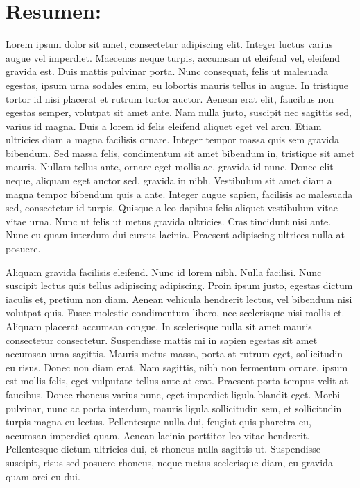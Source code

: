 %
%

\section*{Resumen:}

Lorem ipsum dolor sit amet, consectetur adipiscing elit. Integer luctus varius augue vel imperdiet. Maecenas neque turpis, accumsan ut eleifend vel, eleifend gravida est. Duis mattis pulvinar porta. Nunc consequat, felis ut malesuada egestas, ipsum urna sodales enim, eu lobortis mauris tellus in augue. In tristique tortor id nisi placerat et rutrum tortor auctor. Aenean erat elit, faucibus non egestas semper, volutpat sit amet ante. Nam nulla justo, suscipit nec sagittis sed, varius id magna. Duis a lorem id felis eleifend aliquet eget vel arcu. Etiam ultricies diam a magna facilisis ornare. Integer tempor massa quis sem gravida bibendum. Sed massa felis, condimentum sit amet bibendum in, tristique sit amet mauris. Nullam tellus ante, ornare eget mollis ac, gravida id nunc. Donec elit neque, aliquam eget auctor sed, gravida in nibh. Vestibulum sit amet diam a magna tempor bibendum quis a ante. Integer augue sapien, facilisis ac malesuada sed, consectetur id turpis. Quisque a leo dapibus felis aliquet vestibulum vitae vitae urna. Nunc ut felis ut metus gravida ultricies. Cras tincidunt nisi ante. Nunc eu quam interdum dui cursus lacinia. Praesent adipiscing ultrices nulla at posuere.

Aliquam gravida facilisis eleifend. Nunc id lorem nibh. Nulla facilisi. Nunc suscipit lectus quis tellus adipiscing adipiscing. Proin ipsum justo, egestas dictum iaculis et, pretium non diam. Aenean vehicula hendrerit lectus, vel bibendum nisi volutpat quis. Fusce molestie condimentum libero, nec scelerisque nisi mollis et. Aliquam placerat accumsan congue. In scelerisque nulla sit amet mauris consectetur consectetur. Suspendisse mattis mi in sapien egestas sit amet accumsan urna sagittis. Mauris metus massa, porta at rutrum eget, sollicitudin eu risus. Donec non diam erat. Nam sagittis, nibh non fermentum ornare, ipsum est mollis felis, eget vulputate tellus ante at erat. Praesent porta tempus velit at faucibus. Donec rhoncus varius nunc, eget imperdiet ligula blandit eget. Morbi pulvinar, nunc ac porta interdum, mauris ligula sollicitudin sem, et sollicitudin turpis magna eu lectus. Pellentesque nulla dui, feugiat quis pharetra eu, accumsan imperdiet quam. Aenean lacinia porttitor leo vitae hendrerit. Pellentesque dictum ultricies dui, et rhoncus nulla sagittis ut. Suspendisse suscipit, risus sed posuere rhoncus, neque metus scelerisque diam, eu gravida quam orci eu dui.


